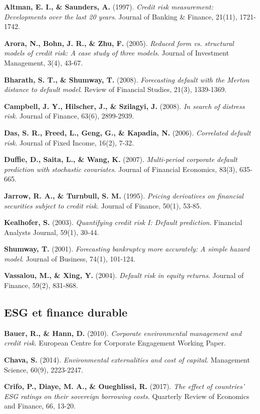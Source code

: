 \textbf{Altman, E. I., \& Saunders, A.} (1997). \textit{Credit risk measurement: Developments over the last 20 years}. Journal of Banking \& Finance, 21(11), 1721-1742.

\textbf{Arora, N., Bohn, J. R., \& Zhu, F.} (2005). \textit{Reduced form vs. structural models of credit risk: A case study of three models}. Journal of Investment Management, 3(4), 43-67.

\textbf{Bharath, S. T., \& Shumway, T.} (2008). \textit{Forecasting default with the Merton distance to default model}. Review of Financial Studies, 21(3), 1339-1369.

\textbf{Campbell, J. Y., Hilscher, J., \& Szilagyi, J.} (2008). \textit{In search of distress risk}. Journal of Finance, 63(6), 2899-2939.

\textbf{Das, S. R., Freed, L., Geng, G., \& Kapadia, N.} (2006). \textit{Correlated default risk}. Journal of Fixed Income, 16(2), 7-32.

\textbf{Duffie, D., Saita, L., \& Wang, K.} (2007). \textit{Multi-period corporate default prediction with stochastic covariates}. Journal of Financial Economics, 83(3), 635-665.

\textbf{Jarrow, R. A., \& Turnbull, S. M.} (1995). \textit{Pricing derivatives on financial securities subject to credit risk}. Journal of Finance, 50(1), 53-85.

\textbf{Kealhofer, S.} (2003). \textit{Quantifying credit risk I: Default prediction}. Financial Analysts Journal, 59(1), 30-44.

\textbf{Shumway, T.} (2001). \textit{Forecasting bankruptcy more accurately: A simple hazard model}. Journal of Business, 74(1), 101-124.

\textbf{Vassalou, M., \& Xing, Y.} (2004). \textit{Default risk in equity returns}. Journal of Finance, 59(2), 831-868.

\subsection{ESG et finance durable}

\textbf{Bauer, R., \& Hann, D.} (2010). \textit{Corporate environmental management and credit risk}. European Centre for Corporate Engagement Working Paper.

\textbf{Chava, S.} (2014). \textit{Environmental externalities and cost of capital}. Management Science, 60(9), 2223-2247.

\textbf{Crifo, P., Diaye, M. A., \& Oueghlissi, R.} (2017). \textit{The effect of countries' ESG ratings on their sovereign borrowing costs}. Quarterly Review of Economics and Finance, 66, 13-20.

